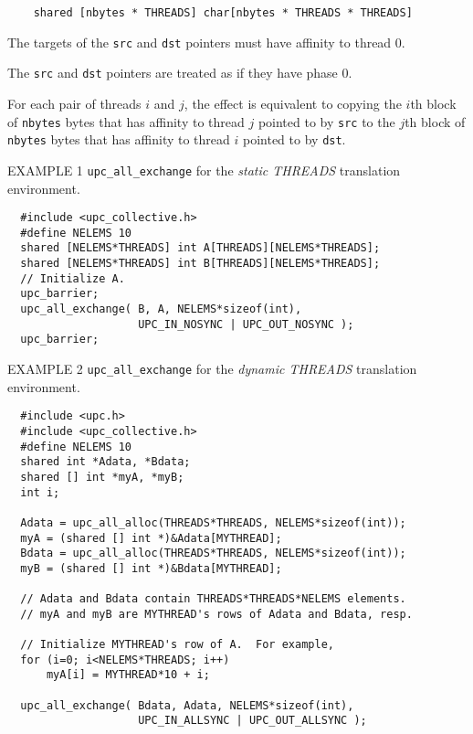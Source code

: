 \begin{verbatim}
    shared [nbytes * THREADS] char[nbytes * THREADS * THREADS]
\end{verbatim}  

\np The targets of the {\tt src} and {\tt dst} pointers
must have affinity to thread 0.

\np The {\tt src} and {\tt dst} pointers are treated as
if they have phase 0.

\np For each pair of threads $i$ and $j$, the effect is equivalent to copying
the $i$th block of {\tt nbytes} bytes that has affinity to thread $j$
pointed to by {\tt src}
to
the $j$th block of {\tt nbytes} bytes that has affinity to thread $i$ 
pointed to by {\tt dst}.


\np EXAMPLE 1 {\tt upc\_all\_exchange} for the {\em static THREADS}
translation environment.

\begin{verbatim}
  #include <upc_collective.h>
  #define NELEMS 10
  shared [NELEMS*THREADS] int A[THREADS][NELEMS*THREADS];
  shared [NELEMS*THREADS] int B[THREADS][NELEMS*THREADS];
  // Initialize A.
  upc_barrier;
  upc_all_exchange( B, A, NELEMS*sizeof(int),
                    UPC_IN_NOSYNC | UPC_OUT_NOSYNC );
  upc_barrier;
\end{verbatim}

\np EXAMPLE 2 {\tt upc\_all\_exchange} for the {\em dynamic THREADS}
translation environment.

\begin{verbatim}
  #include <upc.h>
  #include <upc_collective.h>
  #define NELEMS 10
  shared int *Adata, *Bdata;
  shared [] int *myA, *myB;
  int i;

  Adata = upc_all_alloc(THREADS*THREADS, NELEMS*sizeof(int));
  myA = (shared [] int *)&Adata[MYTHREAD];
  Bdata = upc_all_alloc(THREADS*THREADS, NELEMS*sizeof(int));
  myB = (shared [] int *)&Bdata[MYTHREAD];

  // Adata and Bdata contain THREADS*THREADS*NELEMS elements.
  // myA and myB are MYTHREAD's rows of Adata and Bdata, resp.

  // Initialize MYTHREAD's row of A.  For example,
  for (i=0; i<NELEMS*THREADS; i++)
      myA[i] = MYTHREAD*10 + i;

  upc_all_exchange( Bdata, Adata, NELEMS*sizeof(int),
                    UPC_IN_ALLSYNC | UPC_OUT_ALLSYNC );
\end{verbatim}

